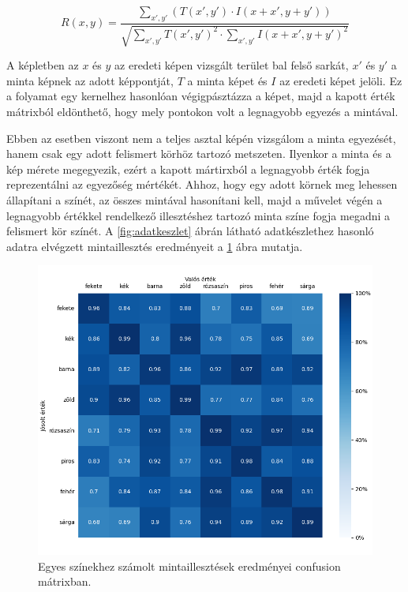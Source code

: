 \begin{equation}
    R(x, y) = \frac{\sum_{x',y'}(T(x',y') \cdot I(x + x', y + y'))}{\sqrt{\sum_{x',y'}T(x',y')^2 \cdot \sum_{x',y'}I(x + x',y + y')^2}}
    \label{for:cross_correlation}
\end{equation}

\par A képletben az $x$ és $y$ az eredeti képen vizsgált terület bal felső sarkát, $x'$ és $y'$ a minta képnek az adott képpontját, $T$ a minta képet és $I$ az eredeti képet jelöli. Ez a folyamat egy kernelhez hasonlóan végigpásztázza a képet, majd a kapott érték mátrixból eldönthető, hogy mely pontokon volt a legnagyobb egyezés a mintával.
\par Ebben az esetben viszont nem a teljes asztal képén vizsgálom a minta egyezését, hanem csak egy adott felismert körhöz tartozó metszeten. Ilyenkor a minta és a kép mérete megegyezik, ezért a kapott mártirxból a legnagyobb érték fogja reprezentálni az egyezőség mértékét. Ahhoz, hogy egy adott körnek meg lehessen állapítani a színét, az összes mintával hasonítani kell, majd a művelet végén a legnagyobb értékkel rendelkező illesztéshez tartozó minta színe fogja megadni a felismert kör színét. A \ref{fig:adatkeszlet} ábrán látható adatkészlethez hasonló adatra elvégzett mintaillesztés eredményeit a \ref{fig:mintaillesztes_eredmeny} ábra mutatja.

\begin{figure}[!ht]
    \centering
    \includegraphics[width=150mm, keepaspectratio]{figures/confusion_matrix_tm.png}
    \caption{Egyes színekhez számolt mintaillesztések eredményei confusion mátrixban.}
    \label{fig:mintaillesztes_eredmeny}
\end{figure}

